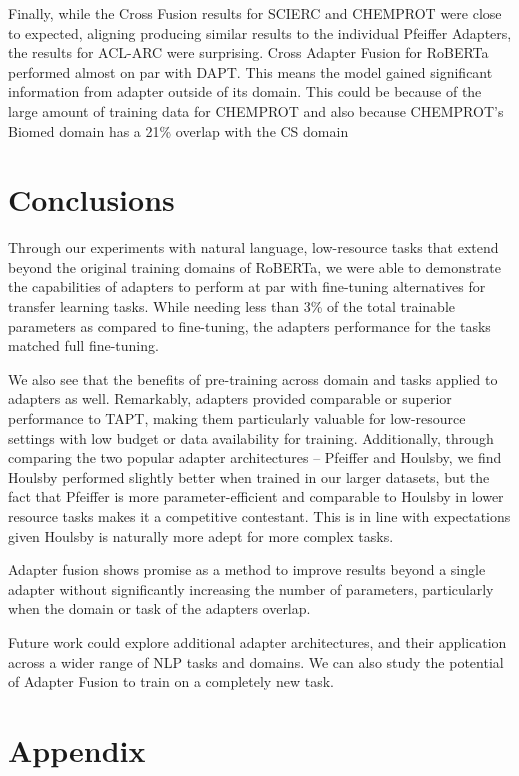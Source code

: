 \documentclass[10pt,twocolumn,letterpaper]{article}
\begin{document}
Finally, while the Cross Fusion results for SCIERC and CHEMPROT were close to expected, aligning producing similar results to the individual Pfeiffer Adapters, the results for ACL-ARC were surprising. Cross Adapter Fusion for RoBERTa performed almost on par with DAPT. This means the model gained significant information from adapter outside of its domain. This could be because of the large amount of training data for CHEMPROT and also because CHEMPROT’s Biomed domain has a 21\% overlap with the CS domain \cite{gururangan2020dont}


\section{Conclusions}
Through our experiments with natural language, low-resource tasks that extend beyond the original training domains of RoBERTa, we were able to demonstrate the capabilities of adapters to perform at par with fine-tuning alternatives for transfer learning tasks. While needing less than 3\% of the total trainable parameters as compared to fine-tuning, the adapters performance for the tasks matched full fine-tuning.

We also see that the benefits of pre-training across domain and tasks applied to adapters as well. Remarkably, adapters provided comparable or superior performance to TAPT, making them particularly valuable for low-resource settings with low budget or data availability for training. Additionally, through comparing the two popular adapter architectures – Pfeiffer and Houlsby, we find Houlsby performed slightly better when trained in our larger datasets, but the fact that Pfeiffer is more parameter-efficient and comparable to Houlsby in lower resource tasks makes it a competitive contestant. This is in line with expectations given Houlsby is naturally more adept for more complex tasks.

Adapter fusion shows promise as a method to improve results beyond a single adapter without significantly increasing the number of parameters, particularly when the domain or task of the adapters overlap.



Future work could explore additional adapter architectures, and their application across a wider range of NLP tasks and domains. We can also study the potential of Adapter Fusion to train on a completely new task.


\onecolumn
\section{Appendix}
\end{document}
